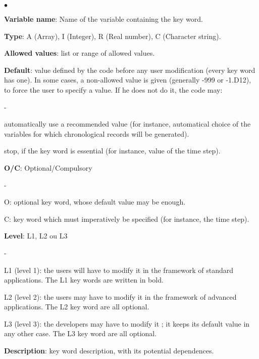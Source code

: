 \begin{list}{$\bullet$}{}
\item \textbf{Variable name}: Name of the variable containing the key word.

\item \textbf{Type}: A (Array), I (Integer), R (Real number), C
      (Character string).

\item \textbf{Allowed values}: list or range of allowed values.

\item \textbf{Default}: value defined by the code before any user
      modification (every key word has one). In some cases, a
      non-allowed value is given (generally -999 or -1.D12), to force the
      user to specify a value. If he does not do it, the code may:
\begin{list}{-}{}
\item automatically use a recommended value (for instance, automatical
      choice of the variables for which chronological records will be
      generated).

\item stop, if the key word is essential (for instance, value of the
      time step).
\end{list}

\item \textbf{O/C}: Optional/Compulsory
\begin{list}{-}{}
\item O: optional key word, whose default value may be enough.

\item C: key word which must imperatively be specified (for instance,
      the time step).
\end{list}

\item \textbf{Level}: L1, L2 ou L3
\begin{list}{-}{}
\item L1 (level 1): the users will have to modify it in the framework of
      standard applications. The L1 key words are written in bold.

\item L2 (level 2): the users may have to modify it in the framework of
      advanced applications. The L2 key word are all optional.

\item L3 (level 3): the developers may have to modify it ; it keeps its
      default value in any other case. The L3 key word are all optional.
\end{list}

\item \textbf{Description}:  key word description, with its potential
      dependences.

\end{list}

